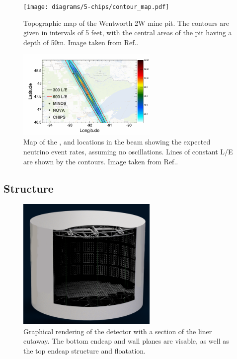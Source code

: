 \begin{figure} %
    \texttt{[image: diagrams/5-chips/contour\_map.pdf]}
    \caption[Topographic map of the Wentworth 2W mine pit.]
    {Topographic map of the Wentworth 2W mine pit. The contours are given in intervals of 5 feet,
        with the central areas of the pit having a depth of 50m. Image taken from
        Ref.\cite{adamson2013}.}
    \label{fig:contour_map}
\end{figure}

\begin{figure} %
    \includegraphics[width=0.6\textwidth]{diagrams/5-chips/numi_map.png}
    \caption[Map of detector locations in the \numi beam.]
    {Map of the \chips, \nova and \minos locations in the \numi beam showing the expected
        neutrino event rates, assuming no oscillations. Lines of constant L/E are shown by the
        contours. Image taken from Ref.\cite{adamson2013}.}
    \label{fig:numi_map}
\end{figure}

\subsection{Structure} %
\label{sec:chips_detector_structure} %

\begin{figure} %
    \includegraphics[width=0.6\textwidth]{diagrams/5-chips/chips_render_1.png}
    \caption[Graphical rendering of the \chipsfive detector with liner cutaway.]
    {Graphical rendering of the \chipsfive detector with a section of the liner cutaway.
        The bottom endcap and wall planes are visable,
        as well as the top endcap structure and floatation.}
    \label{fig:chips_render_1}
\end{figure}

